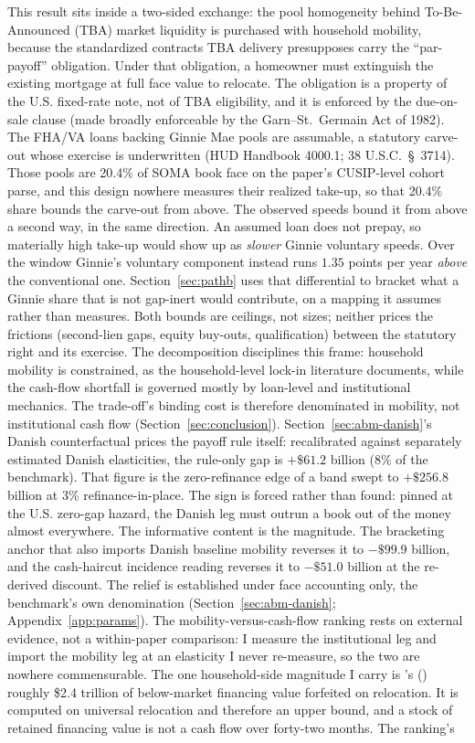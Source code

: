 \documentclass[12pt]{article}
\newcommand{\citepos}[1]{\citeauthor{#1}'s (\citeyear{#1})}
\begin{document}
This result sits inside a two-sided exchange: the pool homogeneity behind To-Be-Announced (TBA) market liquidity \citep[the market's institutional design is reviewed in][]{fuster2023} is purchased with household mobility, because the standardized contracts TBA delivery presupposes carry the ``par-payoff'' obligation. Under that obligation, a homeowner must extinguish the existing mortgage at full face value to relocate. The obligation is a property of the U.S. fixed-rate note, not of TBA eligibility, and it is enforced by the due-on-sale clause (made broadly enforceable by the Garn--St.~Germain Act of 1982). The FHA/VA loans backing Ginnie Mae pools are assumable, a statutory carve-out whose exercise is underwritten (HUD Handbook 4000.1; 38 U.S.C.~\S~3714). Those pools are 20.4\% of SOMA book face on the paper's CUSIP-level cohort parse, and this design nowhere measures their realized take-up, so that 20.4\% share bounds the carve-out from above. The observed speeds bound it from above a second way, in the same direction. An assumed loan does not prepay, so materially high take-up would show up as \emph{slower} Ginnie voluntary speeds. Over the window Ginnie's voluntary component instead runs $1.35$ points per year \emph{above} the conventional one. Section~\ref{sec:pathb} uses that differential to bracket what a Ginnie share that is not gap-inert would contribute, on a mapping it assumes rather than measures. Both bounds are ceilings, not sizes; neither prices the frictions (second-lien gaps, equity buy-outs, qualification) between the statutory right and its exercise. The decomposition disciplines this frame: household mobility is constrained, as the household-level lock-in literature documents, while the cash-flow shortfall is governed mostly by loan-level and institutional mechanics. The trade-off's binding cost is therefore denominated in mobility, not institutional cash flow (Section~\ref{sec:conclusion}). Section~\ref{sec:abm-danish}'s Danish counterfactual prices the payoff rule itself: recalibrated against separately estimated Danish elasticities, the rule-only gap is $+\$61.2$ billion (8\% of the benchmark). That figure is the zero-refinance edge of a band swept to $+\$256.8$ billion at 3\% refinance-in-place. The sign is forced rather than found: pinned at the U.S. zero-gap hazard, the Danish leg must outrun a book out of the money almost everywhere. The informative content is the magnitude. The bracketing anchor that also imports Danish baseline mobility reverses it to $-\$99.9$ billion, and the cash-haircut incidence reading reverses it to $-\$51.0$ billion at the re-derived discount. The relief is established under face accounting only, the benchmark's own denomination (Section~\ref{sec:abm-danish}; Appendix~\ref{app:params}). The mobility-versus-cash-flow ranking rests on external evidence, not a within-paper comparison: I measure the institutional leg and import the mobility leg at an elasticity I never re-measure, so the two are nowhere commensurable. The one household-side magnitude I carry is \citepos{batzer2024} roughly \$2.4 trillion of below-market financing value forfeited on relocation. It is computed on universal relocation and therefore an upper bound, and a stock of retained financing value is not a cash flow over forty-two months. The ranking's 
\end{document}
